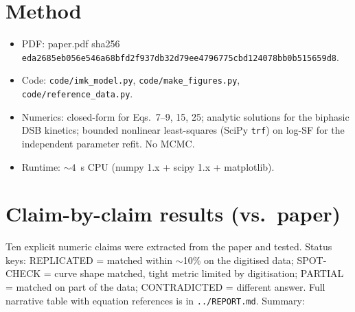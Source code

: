 \documentclass[11pt]{article}
\begin{document}
\section{Method}
\begin{itemize}
    \item PDF: paper.pdf sha256
      \texttt{eda2685eb056e546a68bfd2f937db32d79ee4796775cbd124078bb0b515659d8}.
    \item Code: \texttt{code/imk\_model.py}, \texttt{code/make\_figures.py},
      \texttt{code/reference\_data.py}.
    \item Numerics: closed-form for Eqs.~7--9, 15, 25; analytic
      solutions for the biphasic DSB kinetics; bounded nonlinear
      least-squares (SciPy \texttt{trf}) on log-SF for the
      independent parameter refit. No MCMC.
    \item Runtime: $\sim\!4$~s CPU (numpy 1.x + scipy 1.x + matplotlib).
\end{itemize}

\section{Claim-by-claim results (vs.\ paper)}
Ten explicit numeric claims were extracted from the paper and tested.
Status keys: REPLICATED = matched within $\sim$10\% on the digitised data;
SPOT-CHECK = curve shape matched, tight metric limited by digitisation;
PARTIAL = matched on part of the data; CONTRADICTED = different answer.
Full narrative table with equation references is in \texttt{../REPORT.md}.
Summary:
\end{document}
